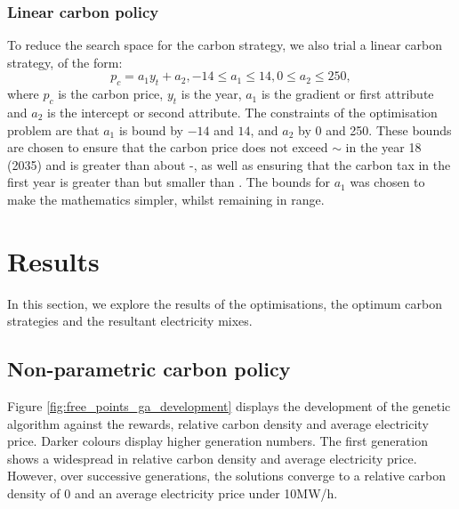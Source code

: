 \subsubsection{Linear carbon policy}
\label{sssec:linear_carbon_strategy}
To reduce the search space for the carbon strategy, we also trial a linear carbon strategy, of the form:
\begin{equation}
p_c=a_1y_t+a_2, -14 \leq a_1\leq 14, 0 \leq a_2\leq 250,
\end{equation}
\noindent where $p_c$ is the carbon price, $y_t$ is the year, $a_1$ is the gradient or first attribute and $a_2$ is the intercept or second attribute. The constraints of the optimisation problem are that $a_1$ is bound by $-14$ and $14$, and $a_2$ by 0 and 250. These bounds are chosen to ensure that the carbon price does not exceed ${\sim}$ in the year 18 (2035) and is greater than about -, as well as ensuring that the carbon tax in the first year is greater than  but smaller than . The bounds for $a_1$ was chosen to make the mathematics simpler, whilst remaining in range.

\section{Results}
\label{carbonoptim:sec:results}



In this section, we explore the results of the optimisations, the optimum carbon strategies and the resultant electricity mixes.

\subsection{Non-parametric carbon policy}
\label{sssec:result_non_parametric_strategy}

Figure \ref{fig:free_points_ga_development} displays the development of the genetic algorithm against the rewards, relative carbon density and average electricity price. Darker colours display higher generation numbers. The first generation shows a widespread in relative carbon density and average electricity price. However, over successive generations, the solutions converge to a relative carbon density of 0 and an average electricity price under \textsterling10MW/h. 

